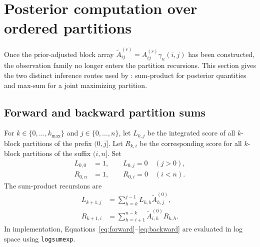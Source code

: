 \section{Posterior computation over ordered partitions}
\label{sec:exact-inference}

Once the prior-adjusted block array
$\widetilde A^{(r)}_{ij}=A^{(r)}_{ij}\gamma_u(i,j)$ has been constructed, the observation family no longer enters the partition recursions. This section gives the two distinct inference routes used by \BayesBreak: sum-product for posterior quantities and max-sum for a joint maximizing partition.



\subsection{Forward and backward partition sums}
For $k\in\{0,\ldots,k_{\max}\}$ and $j\in\{0,\ldots,n\}$, let $L_{k,j}$ be the integrated score of all $k$-block partitions of the prefix $(0,j]$. Let $R_{k,i}$ be the corresponding score for all $k$-block partitions of the suffix $(i,n]$. Set
\begin{align*}
L_{0,0}&=1,\qquad L_{0,j}=0\quad(j>0),\\
R_{0,n}&=1,\qquad R_{0,i}=0\quad(i<n).
\end{align*}
The sum-product recursions are
\begin{align}
L_{k+1,j}&=\sum_{h=k}^{j-1}L_{k,h}\widetilde A^{(0)}_{h,j},
\label{eq:forward}\\
R_{k+1,i}&=\sum_{h=i+1}^{n-k}\widetilde A^{(0)}_{i,h}R_{k,h}.
\label{eq:backward}
\end{align}
In implementation, Equations~\eqref{eq:forward}--\eqref{eq:backward} are evaluated in log space using \texttt{logsumexp}.

